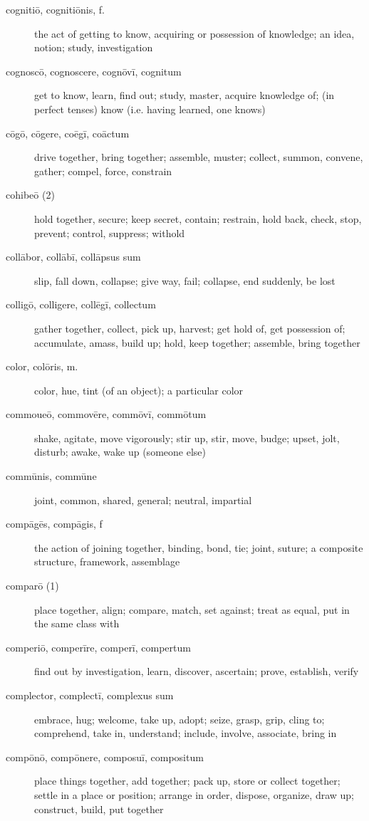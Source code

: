 \begin{description}
    \item[cognitiō, cognitiōnis, f.] \marginnote{*}the act of getting to know, acquiring or possession of knowledge; an idea, notion; study, investigation
    \item[cognoscō, cognoscere, cognōvī, cognitum] \marginnote{*}get to know, learn, find out; study, master, acquire knowledge of; (in perfect tenses) know (i.e. having learned, one knows)
    \item[cōgō, cōgere, coēgī, coāctum] \marginnote{*}drive together, bring together; assemble, muster; collect, summon, convene, gather; compel, force, constrain
    \item[cohibeō (2)] hold together, secure; keep secret, contain; restrain, hold back, check, stop, prevent; control, suppress; withold
    \item[collābor, collābī, collāpsus sum] slip, fall down, collapse; give way, fail; collapse, end suddenly, be lost
    \item[colligō, colligere, collēgī, collectum] \marginnote{*}gather together, collect, pick up, harvest; get hold of, get possession of; accumulate, amass, build up; hold, keep together; assemble, bring together
    \item[color, colōris, m.] \marginnote{*}color, hue, tint (of an object); a particular color
    \item[commoueō, commovēre, commōvī, commōtum] shake, agitate, move vigorously; stir up, stir, move, budge; upset, jolt, disturb; awake, wake up (someone else)
    \item[commūnis, commūne] \marginnote{*}joint, common, shared, general; neutral, impartial
    \item[compāgēs, compāgis, f] the action of joining together, binding, bond, tie; joint, suture; a composite structure, framework, assemblage
    \item[comparō (1)] \marginnote{*}place together, align; compare, match, set against; treat as equal, put in the same class with
    \item[comperiō, comperīre, comperī, compertum] find out by investigation, learn, discover, ascertain; prove, establish, verify
    \item[complector, complectī, complexus sum] embrace, hug; welcome, take up, adopt; seize, grasp, grip, cling to; comprehend, take in, understand; include, involve, associate, bring in
    \item[compōnō, compōnere, composuī, compositum] \marginnote{*}place things together, add together; pack up, store or collect together; settle in a place or position; arrange in order, dispose, organize, draw up; construct, build, put together

\end{description}
